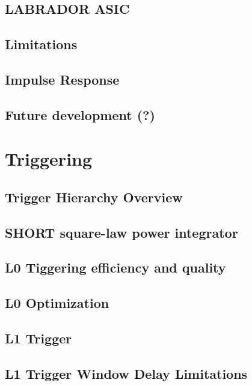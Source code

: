 \documentclass[11pt]{uhthesis}
\begin{document}
	\subsection{LABRADOR ASIC}

	\subsection{Limitations}

	\subsection{Impulse Response}
	
	\subsection{Future development (?)}
		
		
\section{Triggering}
	
	\subsection{Trigger Hierarchy Overview}
	
	\subsection{SHORT square-law power integrator}
		
	\subsection{L0 Tiggering efficiency and quality}
		
	\subsection{L0 Optimization}
	
	\subsection{L1 Trigger}
	
	\subsection{L1 Trigger Window Delay Limitations}
		
\end{document}
